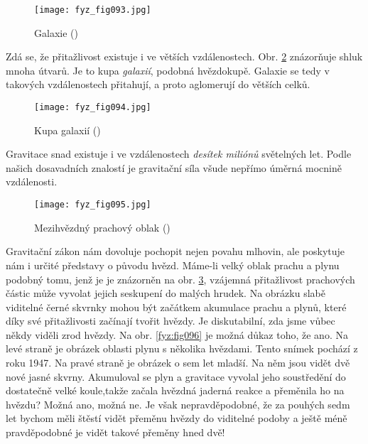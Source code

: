     \begin{figure}[ht!]  %
      \centering
      \texttt{[image: fyz\_fig093.jpg]}
      \caption{Galaxie (\cite[s.~99]{Feynman01})}
      \label{fyz:fig093}
    \end{figure}
    
    Zdá se, že přitažlivost existuje i ve větších vzdálenostech. Obr. \ref{fyz:fig094} znázorňuje 
    shluk mnoha  útvarů. Je to kupa \emph{galaxií}, podobná hvězdokupě. Galaxie se 
    tedy v takových vzdálenostech přitahují, a proto aglomerují do větších celků.

    \begin{figure}[ht!]  %
      \centering
      \texttt{[image: fyz\_fig094.jpg]}
      \caption{Kupa galaxií (\cite[s.~100]{Feynman01})}
      \label{fyz:fig094}
    \end{figure}
    
    Gravitace snad existuje i ve vzdálenostech \emph{desítek miliónů} světelných let. Podle našich 
    dosavadních znalostí je gravitační síla všude nepřímo úměrná mocnině vzdálenosti. 

    \begin{figure}[ht!]  %
      \centering
      \texttt{[image: fyz\_fig095.jpg]}
      \caption{Mezihvězdný prachový oblak (\cite[s.~101]{Feynman01})}
      \label{fyz:fig095}
    \end{figure}
    
    Gravitační zákon nám dovoluje pochopit nejen povahu mlhovin, ale poskytuje nám i určité 
    představy o původu hvězd. Máme-li velký oblak prachu a plynu podobný tomu, jenž je je znázorněn 
    na obr. \ref{fyz:fig095}, vzájemná přitažlivost prachových částic může vyvolat jejich seskupení 
    do malých hrudek. Na obrázku slabě viditelné  černé skvrnky mohou být začátkem 
    akumulace prachu a plynů, které díky své přitažlivosti začínají tvořit hvězdy. Je diskutabilní, 
    zda jsme vůbec někdy viděli zrod hvězdy. Na obr. \ref{fyz:fig096} je možná důkaz toho, že ano. 
    Na levé straně je obrázek oblasti plynu s několika hvězdami. Tento snímek pochází z roku 
    \num{1947}. Na pravé straně je obrázek o sem let mladší. Na něm jsou vidět dvě nové jasné 
    skvrny. Akumuloval se plyn a gravitace vyvolal jeho soustředění do dostatečně velké koule,takže 
    začala hvězdná jaderná reakce a přeměnila ho na hvězdu? Možná ano, možná ne. Je však 
    nepravděpodobné, že za pouhých sedm let bychom měli štěstí vidět přeměnu hvězdy do viditelné 
    podoby a ještě méně pravděpodobné je vidět takové přeměny hned dvě!

